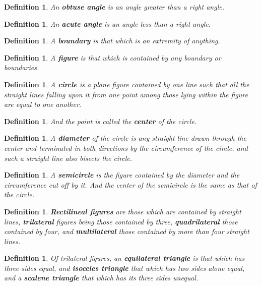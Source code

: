 \documentclass[letterpaper, 12pt]{amsart}
\newtheorem{defn}[thm]{Definition}
\theoremstyle{definition}  %
\begin{document}
		\begin{defn}
		An \textbf{obtuse angle} is an angle greater than a right angle.
		\end{defn}

		\begin{defn}
		An \textbf{acute angle} is an angle less than a right angle.
		\end{defn}

		\begin{defn}
		A \textbf{boundary} is that which is an extremity of anything.
		\end{defn}

		\begin{defn}
		A \textbf{figure} is that which is contained by any boundary or boundaries.
		\end{defn}

		\begin{defn}
		A \textbf{circle} is a plane figure contained by one line such that all the straight lines falling upon it from one point among those lying within the figure are equal to one another.
		\end{defn}

		\begin{defn}
		And the point is called the \textbf{center} of the circle.
		\end{defn}

		\begin{defn}
		A \textbf{diameter} of the circle is any straight line drawn through the center and terminated in both directions by the circumference of the circle, and such a straight line also bisects the circle.
		\end{defn}

		\begin{defn}
		A \textbf{semicircle} is the figure contained by the diameter and the circumference cut off by it.
		And the center of the semicircle is the same as that of the circle.
		\end{defn}

		\begin{defn}
		\textbf{Rectilineal figures} are those which are contained by straight lines, \textbf{trilateral} figures being those contained by three, \textbf{quadrilateral} those contained by four, and \textbf{multilateral} those contained by more than four straight lines.
		\end{defn}

		\begin{defn}
		Of trilateral figures, an \textbf{equilateral triangle} is that which has three sides equal, and \textbf{isoceles triangle} that which has two sides alone equal, and a \textbf{scalene triangle} that which has its three sides unequal.
		\end{defn}
\end{document}
